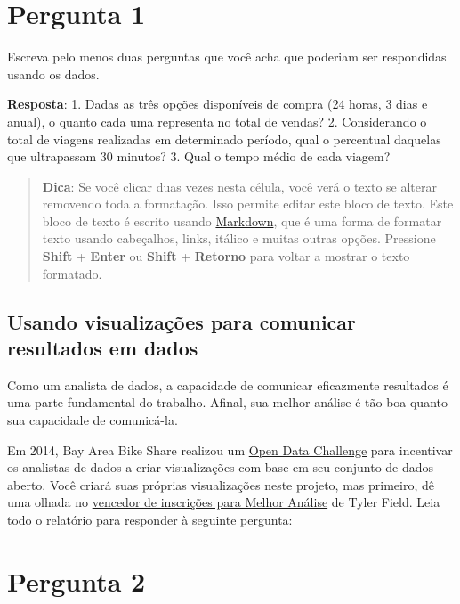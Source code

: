 \documentclass[11pt]{article}
\begin{document}
    \section{Pergunta 1}\label{pergunta-1}

Escreva pelo menos duas perguntas que você acha que poderiam ser
respondidas usando os dados.

    \textbf{Resposta}: 1. Dadas as três opções disponíveis de compra (24
horas, 3 dias e anual), o quanto cada uma representa no total de vendas?
2. Considerando o total de viagens realizadas em determinado período,
qual o percentual daquelas que ultrapassam 30 minutos? 3. Qual o tempo
médio de cada viagem?

\begin{quote}
\textbf{Dica}: Se você clicar duas vezes nesta célula, você verá o texto
se alterar removendo toda a formatação. Isso permite editar este bloco
de texto. Este bloco de texto é escrito usando
\href{http://daringfireball.net/projects/markdown/syntax}{Markdown}, que
é uma forma de formatar texto usando cabeçalhos, links, itálico e muitas
outras opções. Pressione \textbf{Shift} + \textbf{Enter} ou
\textbf{Shift} + \textbf{Retorno} para voltar a mostrar o texto
formatado.
\end{quote}

    \subsection{Usando visualizações para comunicar resultados em
dados}\label{usando-visualizauxe7uxf5es-para-comunicar-resultados-em-dados}

Como um analista de dados, a capacidade de comunicar eficazmente
resultados é uma parte fundamental do trabalho. Afinal, sua melhor
análise é tão boa quanto sua capacidade de comunicá-la.

Em 2014, Bay Area Bike Share realizou um
\href{http://www.bayareabikeshare.com/datachallenge-2014}{Open Data
Challenge} para incentivar os analistas de dados a criar visualizações
com base em seu conjunto de dados aberto. Você criará suas próprias
visualizações neste projeto, mas primeiro, dê uma olhada no
\href{http://thfield.github.io/babs/index.html}{vencedor de inscrições
para Melhor Análise} de Tyler Field. Leia todo o relatório para
responder à seguinte pergunta:

    \section{Pergunta 2}\label{pergunta-2}
\end{document}
